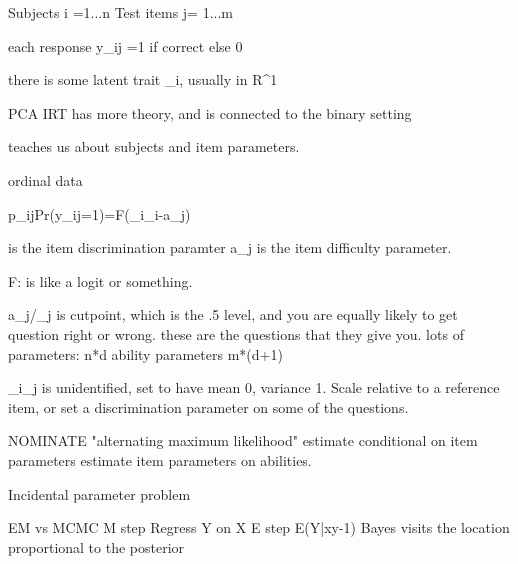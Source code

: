 Subjects i =1...n
Test items j= 1...m

each response y_ij  =1 if correct else 0

there is some latent trait \xi_i, usually in R^1  

PCA
IRT has more theory, and is connected to the binary setting

teaches us about subjects and item parameters.

ordinal data

p_ij\equiv Pr(y_ij=1)=F(\xi_i\beta_i-a_j)

\beta is the item discrimination paramter
a_j is the item difficulty parameter.

F: is like a logit or something.

a_j/\beta_j is cutpoint, which is the .5 level, and you are equally likely to get question right or wrong.  these are the questions that they give you.
lots of parameters:
n*d ability parameters
m*(d+1)


\xi_i\beta_j is unidentified, set \xi to have mean 0, variance 1.    Scale relative to a reference item, or set a discrimination parameter on some of the questions.

NOMINATE
"alternating maximum likelihood"
estimate conditional on item parameters
estimate item parameters on abilities.

Incidental parameter problem

EM 
vs 
MCMC
M step Regress Y on X
E step E(Y|x\beta y-1)
Bayes visits the location proportional to the posterior